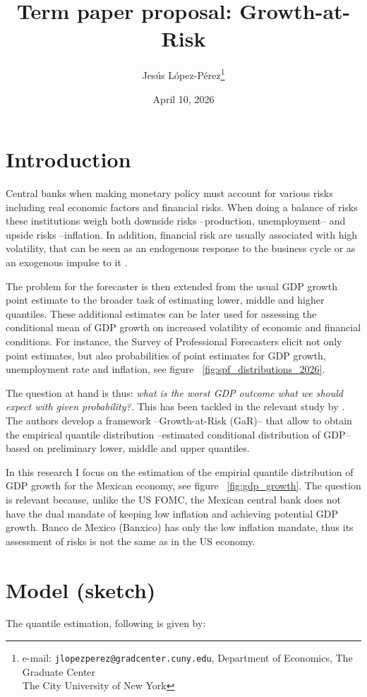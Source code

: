 \documentclass[12pt]{article}
\title{Term paper proposal: Growth-at-Risk}
\author{Jes\'us L\'opez-P\'erez\thanks{e-mail: \texttt{jlopezperez@gradcenter.cuny.edu}, Department of Economics, The Graduate Center\\ The City University of New York}}
\affil{Spring 2026}
\date{April 10, 2026}
\begin{document}
\maketitle


\section{Introduction}
Central banks when making monetary policy must account for various risks including real economic factors and financial risks. When doing a balance of risks these institutions weigh both downside risks --production, unemployment-- and upside risks --inflation. In addition, financial risk are usually associated with high volatility, that can be seen as an endogenous response to the business cycle or as an exogenous impulse to it \citep{ludvigson2021uncertainty}. 

The problem for the forecaster is then extended from the usual GDP growth point estimate to the broader task of estimating lower, middle and higher quantiles. These additional estimates can be later used for assessing the conditional mean of GDP growth on increased volatility of economic and financial conditions. For instance, the Survey of Professional Forecasters elicit not only point estimates, but also probabilities of point estimates for GDP growth, unemployment rate and inflation, see figure ~\ref{fig:spf_distributions_2026}.

The question at hand is thus:\textit{ what is the worst GDP outcome what we should expect with given probability?.} This has been tackled in the relevant study by \cite{adrian2019vulnerable}. The authors develop a framework --Growth-at-Risk (GaR)-- that allow to obtain the empirical quantile distribution --estimated conditional distribution of GDP-- based on preliminary lower, middle and upper quantiles. 


In this research I focus on the estimation of the empirial quantile distribution of GDP growth for the Mexican economy, see figure ~\ref{fig:gdp_growth}. The question is relevant because, unlike the US FOMC, the Mexican central bank does not have the dual mandate of keeping low inflation and achieving potential GDP growth. Banco de Mexico (Banxico) has only the low inflation mandate, thus its assessment of risks is not the same as in the US economy.


\section{Model (sketch)}
The quantile estimation, following \cite{adrian2019vulnerable} is given by: 
\end{document}
